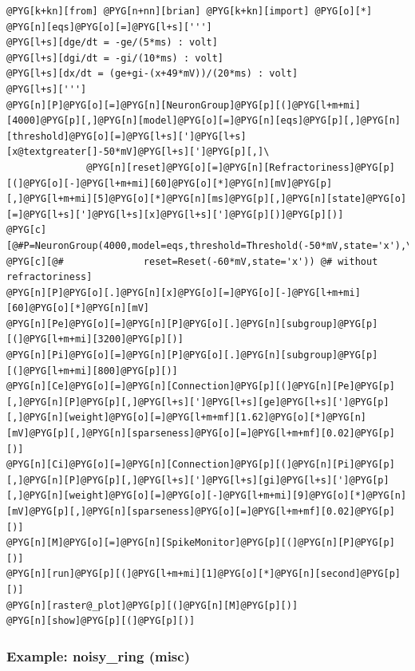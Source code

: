\documentclass[letterpaper,10pt,english]{manual}
\begin{document}
\begin{Verbatim}[commandchars=@\[\]]
@PYG[k+kn][from] @PYG[n+nn][brian] @PYG[k+kn][import] @PYG[o][*]
@PYG[n][eqs]@PYG[o][=]@PYG[l+s][''']
@PYG[l+s][dge/dt = -ge/(5*ms) : volt]
@PYG[l+s][dgi/dt = -gi/(10*ms) : volt]
@PYG[l+s][dx/dt = (ge+gi-(x+49*mV))/(20*ms) : volt]
@PYG[l+s][''']
@PYG[n][P]@PYG[o][=]@PYG[n][NeuronGroup]@PYG[p][(]@PYG[l+m+mi][4000]@PYG[p][,]@PYG[n][model]@PYG[o][=]@PYG[n][eqs]@PYG[p][,]@PYG[n][threshold]@PYG[o][=]@PYG[l+s][']@PYG[l+s][x@textgreater[]-50*mV]@PYG[l+s][']@PYG[p][,]\
              @PYG[n][reset]@PYG[o][=]@PYG[n][Refractoriness]@PYG[p][(]@PYG[o][-]@PYG[l+m+mi][60]@PYG[o][*]@PYG[n][mV]@PYG[p][,]@PYG[l+m+mi][5]@PYG[o][*]@PYG[n][ms]@PYG[p][,]@PYG[n][state]@PYG[o][=]@PYG[l+s][']@PYG[l+s][x]@PYG[l+s][']@PYG[p][)]@PYG[p][)]
@PYG[c][@#P=NeuronGroup(4000,model=eqs,threshold=Threshold(-50*mV,state='x'),\]
@PYG[c][@#              reset=Reset(-60*mV,state='x')) @# without refractoriness]
@PYG[n][P]@PYG[o][.]@PYG[n][x]@PYG[o][=]@PYG[o][-]@PYG[l+m+mi][60]@PYG[o][*]@PYG[n][mV]
@PYG[n][Pe]@PYG[o][=]@PYG[n][P]@PYG[o][.]@PYG[n][subgroup]@PYG[p][(]@PYG[l+m+mi][3200]@PYG[p][)]
@PYG[n][Pi]@PYG[o][=]@PYG[n][P]@PYG[o][.]@PYG[n][subgroup]@PYG[p][(]@PYG[l+m+mi][800]@PYG[p][)]
@PYG[n][Ce]@PYG[o][=]@PYG[n][Connection]@PYG[p][(]@PYG[n][Pe]@PYG[p][,]@PYG[n][P]@PYG[p][,]@PYG[l+s][']@PYG[l+s][ge]@PYG[l+s][']@PYG[p][,]@PYG[n][weight]@PYG[o][=]@PYG[l+m+mf][1.62]@PYG[o][*]@PYG[n][mV]@PYG[p][,]@PYG[n][sparseness]@PYG[o][=]@PYG[l+m+mf][0.02]@PYG[p][)]
@PYG[n][Ci]@PYG[o][=]@PYG[n][Connection]@PYG[p][(]@PYG[n][Pi]@PYG[p][,]@PYG[n][P]@PYG[p][,]@PYG[l+s][']@PYG[l+s][gi]@PYG[l+s][']@PYG[p][,]@PYG[n][weight]@PYG[o][=]@PYG[o][-]@PYG[l+m+mi][9]@PYG[o][*]@PYG[n][mV]@PYG[p][,]@PYG[n][sparseness]@PYG[o][=]@PYG[l+m+mf][0.02]@PYG[p][)]
@PYG[n][M]@PYG[o][=]@PYG[n][SpikeMonitor]@PYG[p][(]@PYG[n][P]@PYG[p][)]
@PYG[n][run]@PYG[p][(]@PYG[l+m+mi][1]@PYG[o][*]@PYG[n][second]@PYG[p][)]
@PYG[n][raster@_plot]@PYG[p][(]@PYG[n][M]@PYG[p][)]
@PYG[n][show]@PYG[p][(]@PYG[p][)]
\end{Verbatim}

\resetcurrentobjects
\hypertarget{--doc-examples-misc_noisy_ring}{}

\hypertarget{index-55}{}\subsubsection{Example: noisy\_ring (misc)}
\end{document}
